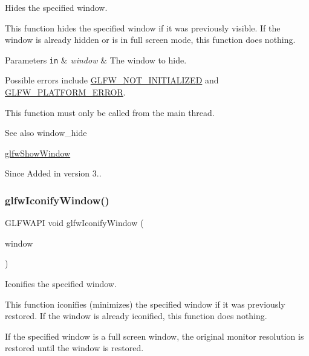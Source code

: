 Hides the specified window. 

This function hides the specified window if it was previously visible. If the window is already hidden or is in full screen mode, this function does nothing.


\begin{DoxyParams}[1]{Parameters}
\mbox{\tt in}  & {\em window} & The window to hide.\\
\hline
\end{DoxyParams}
Possible errors include \hyperlink{group__errors_ga2374ee02c177f12e1fa76ff3ed15e14a}{G\+L\+F\+W\+\_\+\+N\+O\+T\+\_\+\+I\+N\+I\+T\+I\+A\+L\+I\+Z\+ED} and \hyperlink{group__errors_gad44162d78100ea5e87cdd38426b8c7a1}{G\+L\+F\+W\+\_\+\+P\+L\+A\+T\+F\+O\+R\+M\+\_\+\+E\+R\+R\+OR}.

This function must only be called from the main thread.

\begin{DoxySeeAlso}{See also}
window\+\_\+hide 

\hyperlink{group__window_ga7945bcdff9e5e058cf36505d6873ed8c}{glfw\+Show\+Window}
\end{DoxySeeAlso}
\begin{DoxySince}{Since}
Added in version 3.. 
\end{DoxySince}
\mbox{\label{group__window_ga24274e3c6ecd44e11fec5e6b66e4d7f3}} 
\subsubsection{\texorpdfstring{glfw\+Iconify\+Window()}{glfwIconifyWindow()}}
{\footnotesize\ttfamily G\+L\+F\+W\+A\+PI void glfw\+Iconify\+Window (\begin{DoxyParamCaption}\item[{\hyperlink{group__window_ga3c96d80d363e67d13a41b5d1821f3242}{G\+L\+F\+Wwindow} $\ast$}]{window }\end{DoxyParamCaption})}



Iconifies the specified window. 

This function iconifies (minimizes) the specified window if it was previously restored. If the window is already iconified, this function does nothing.

If the specified window is a full screen window, the original monitor resolution is restored until the window is restored.


